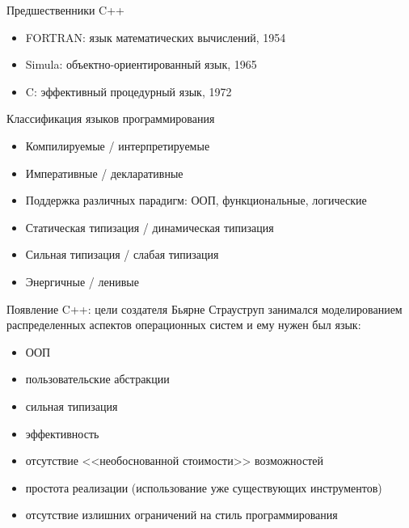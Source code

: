 \documentclass[unknownkeysallowed,xcolor=table]{beamer}
\begin{document}
\begin{frame}{Предшественники C++}
\begin{itemize}
  \item FORTRAN: язык математических вычислений, 1954 \vspace{3em}
  \item Simula: объектно-ориентированный язык, 1965 \vspace{3em}
  \item C: эффективный процедурный язык, 1972
\end{itemize}
\end{frame}

\begin{frame}{Классификация языков программирования}
\begin{itemize}
  \item Компилируемые / интерпретируемые \vspace{1em}
  \item Императивные / декларативные \vspace{1em}
  \item Поддержка различных парадигм: ООП, функциональные, логические \vspace{1em}
  \item Статическая типизация / динамическая типизация \vspace{1em}
  \item Сильная типизация / слабая типизация \vspace{1em}
  \item Энергичные / ленивые
\end{itemize}
\end{frame}

\begin{frame}{Появление C++: цели создателя}
Бьярне Страуструп занимался моделированием распределенных аспектов операционных систем и ему нужен был язык:
\begin{itemize}
  \item ООП
  \item пользовательские абстракции
  \item сильная типизация
  \item эффективность
  \item отсутствие <<необоснованной стоимости>> возможностей
  \item простота реализации (использование уже существующих инструментов)
  \item отсутствие излишних ограничений на стиль программирования
\end{itemize}
\end{frame}
\end{document}
